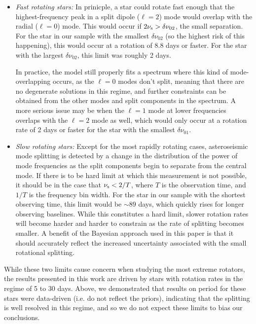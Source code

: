 \begin{itemize}
	\item \textit{Fast rotating stars:} In prinicple, a star could rotate fast enough that the highest-frequency peak in a split dipole ($\ell = 2$) mode would overlap with the radial ($\ell = 0$) mode. This would occur if $2\nu_{\rm s} > \delta\nu_{02}$, the small separation. For the star in our sample with the smallest $\delta\nu_{02}$ (so the highest risk of this happening), this would occur at a rotation of 8.8 days or faster. For the star with the largest $\delta\nu_{02}$, this limit was roughly 2 days.
	
	In practice, the model still properly fits a spectrum where this kind of mode-overlapping occurs, as the $\ell = 0$ modes don't split, meaning that there are no degenerate solutions in this regime, and further constraints can be obtained from the other modes and split components in the spectrum. A more serious issue may be when the $\ell = 1$ mode at lower frequencies overlaps with the $\ell = 2$ mode as well, which would only occur at a rotation rate of 2 days or faster for the star with the smallest $\delta\nu_{01}$.
	
	\item \textit{Slow rotating stars:} Except for the most rapidly rotating cases, asteroseismic mode splitting is detected by a change in the distribution of the power of mode frequencies as the split components begin to separate from the central mode. If there is to be hard limit at which this measurement is not possible, it should be in the case that $\nu_{\rm s} < 2/T$, where $T$ is the observation time, and $1/T$ is the frequency bin width. For the star in our sample with the shortest observing time, this limit would be $\sim 89$ days, which quickly rises for longer observing baselines. While this constitutes a hard limit, slower rotation rates will become harder and harder to constrain as the rate of splitting becomes smaller. A benefit of the Bayesian approach used in this paper is that it should accurately reflect the increased uncertainty associated with the small rotational splitting.
\end{itemize}

While these two limits cause concern when studying the most extreme rotators, the results presented in this work are driven by stars with rotation rates in the regime of 5 to 30 days. Above, we demonstrated that results on period for these stars were data-driven (i.e. do not reflect the priors), indicating that the splitting is well resolved in this regime, and so we do not expect these limits to bias our conclusions.

